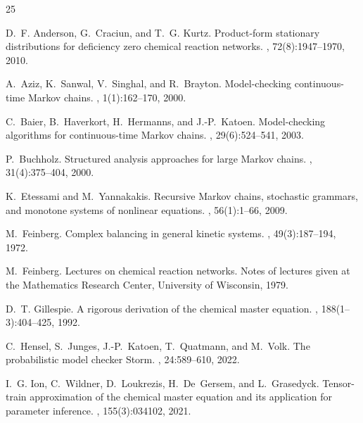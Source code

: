 \documentclass[11pt]{article}
\begin{document}


\begin{thebibliography}{25}

D.~F. Anderson, G.~Craciun, and T.~G. Kurtz.
\newblock Product-form stationary distributions for deficiency zero chemical
  reaction networks.
, 72(8):1947--1970, 2010.

A.~Aziz, K.~Sanwal, V.~Singhal, and R.~Brayton.
\newblock Model-checking continuous-time {M}arkov chains.
, 1(1):162--170, 2000.

C.~Baier, B.~Haverkort, H.~Hermanns, and J.-P.~Katoen.
\newblock Model-checking algorithms for continuous-time {M}arkov chains.
, 29(6):524--541, 2003.

P.~Buchholz.
\newblock Structured analysis approaches for large {M}arkov chains.
, 31(4):375--404, 2000.

K.~Etessami and M.~Yannakakis.
\newblock Recursive {M}arkov chains, stochastic grammars, and monotone systems
  of nonlinear equations.
, 56(1):1--66, 2009.

M.~Feinberg.
\newblock Complex balancing in general kinetic systems.
, 49(3):187--194, 1972.

M.~Feinberg.
\newblock Lectures on chemical reaction networks.
\newblock Notes of lectures given at the Mathematics Research Center,
  University of Wisconsin, 1979.

D.~T. Gillespie.
\newblock A rigorous derivation of the chemical master equation.
, 188(1--3):404--425, 1992.

C.~Hensel, S.~Junges, J.-P.~Katoen, T.~Quatmann, and M.~Volk.
\newblock The probabilistic model checker {S}torm.
, 24:589--610, 2022.

I.~G. Ion, C.~Wildner, D.~Loukrezis, H.~De~Gersem, and
  L.~Grasedyck.
\newblock Tensor-train approximation of the chemical master equation
  and its application for parameter inference.
, 155(3):034102, 2021.


\end{thebibliography}
\end{document}
